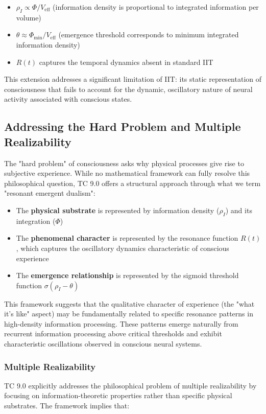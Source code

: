 \documentclass[12pt]{article}
\begin{document}
\begin{itemize}
    \item $\rho_I \propto \Phi / V_{\text{eff}}$ (information density is proportional to integrated information per volume)
    \item $\theta \approx \Phi_{\text{min}} / V_{\text{eff}}$ (emergence threshold corresponds to minimum integrated information density)
    \item $R(t)$ captures the temporal dynamics absent in standard IIT
\end{itemize}

This extension addresses a significant limitation of IIT: its static representation of consciousness that fails to account for the dynamic, oscillatory nature of neural activity associated with conscious states.

\subsection{Addressing the Hard Problem and Multiple Realizability}
The "hard problem" of consciousness \cite{chalmers1995} asks why physical processes give rise to subjective experience. While no mathematical framework can fully resolve this philosophical question, TC 9.0 offers a structural approach through what we term "resonant emergent dualism":

\begin{itemize}
    \item The \textbf{physical substrate} is represented by information density ($\rho_I$) and its integration ($\Phi$)
    
    \item The \textbf{phenomenal character} is represented by the resonance function $R(t)$, which captures the oscillatory dynamics characteristic of conscious experience
    
    \item The \textbf{emergence relationship} is represented by the sigmoid threshold function $\sigma(\rho_I - \theta)$
\end{itemize}

This framework suggests that the qualitative character of experience (the "what it's like" aspect) may be fundamentally related to specific resonance patterns in high-density information processing. These patterns emerge naturally from recurrent information processing above critical thresholds and exhibit characteristic oscillations observed in conscious neural systems.

\subsubsection{Multiple Realizability}
TC 9.0 explicitly addresses the philosophical problem of multiple realizability \cite{putnam1967} by focusing on information-theoretic properties rather than specific physical substrates. The framework implies that:
\end{document}
